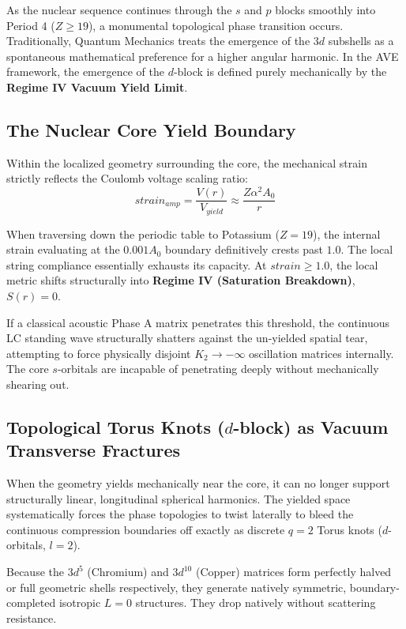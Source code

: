 As the nuclear sequence continues through the $s$ and $p$ blocks smoothly into Period 4 ($Z \ge 19$), a monumental topological phase transition occurs. Traditionally, Quantum Mechanics treats the emergence of the $3d$ subshells as a spontaneous mathematical preference for a higher angular harmonic. In the AVE framework, the emergence of the $d$-block is defined purely mechanically by the \textbf{Regime IV Vacuum Yield Limit}.

\subsection{The Nuclear Core Yield Boundary}
Within the localized geometry surrounding the core, the mechanical strain strictly reflects the Coulomb voltage scaling ratio:
\begin{equation}
    strain_{amp} = \frac{V(r)}{V_{yield}} \approx \frac{Z \alpha^2 A_0}{r}
\end{equation}

When traversing down the periodic table to Potassium ($Z=19$), the internal strain evaluating at the $0.001 A_0$ boundary definitively crests past $1.0$. The local string compliance essentially exhausts its capacity. At $strain \ge 1.0$, the local metric shifts structurally into \textbf{Regime IV (Saturation Breakdown)}, $S(r) = 0$.

If a classical acoustic Phase A matrix penetrates this threshold, the continuous LC standing wave structurally shatters against the un-yielded spatial tear, attempting to force physically disjoint $K_2 \to -\infty$ oscillation matrices internally. The core $s$-orbitals are incapable of penetrating deeply without mechanically shearing out. 

\subsection{Topological Torus Knots ($d$-block) as Vacuum Transverse Fractures}
When the geometry yields mechanically near the core, it can no longer support structurally linear, longitudinal spherical harmonics. The yielded space systematically forces the phase topologies to twist laterally to bleed the continuous compression boundaries off exactly as discrete $q=2$ Torus knots ($d$-orbitals, $l=2$).

Because the $3d^5$ (Chromium) and $3d^{10}$ (Copper) matrices form perfectly halved or full geometric shells respectively, they generate natively symmetric, boundary-completed isotropic $L=0$ structures. They drop natively without scattering resistance.

